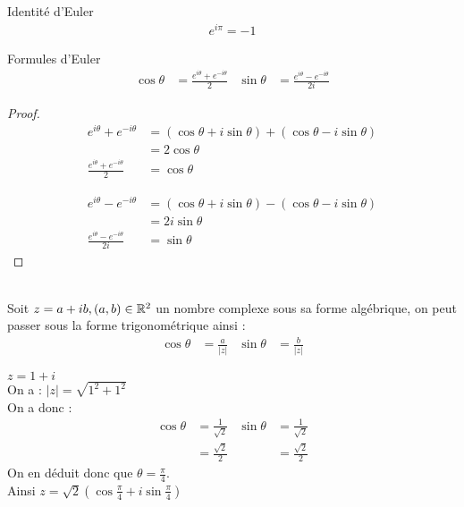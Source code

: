 \begin{proposition}{Identité d'Euler}
    \begin{align*}
        e^{i \pi} = -1
    \end{align*}
\end{proposition}

\begin{proposition}{Formules d'Euler}
    \begin{align*}
        \cos{\theta} &= \frac{e^{i\theta} + e^{-i\theta}}{2} & \sin{\theta} &= \frac{e^{i\theta} - e^{-i\theta}}{2i}
    \end{align*}
\end{proposition}
\begin{proof}
        \begin{align*}
            e^{i\theta} + e^{-i\theta} &= (\cos{\theta} + i\sin{\theta}) + (\cos{\theta} - i\sin{\theta}) \\
                                       &= 2\cos{\theta} \\
        \frac{e^{i\theta} + e^{-i\theta}}{2} &= \cos{\theta}
        \end{align*}
        
        \begin{align*}
            e^{i\theta} - e^{-i\theta} &= (\cos{\theta} + i\sin{\theta}) - (\cos{\theta} - i\sin{\theta}) \\
                                       &= 2i\sin{\theta} \\
            \frac{e^{i\theta} - e^{-i\theta}}{2i} &= \sin{\theta} 
        \end{align*}
\end{proof}

\begin{remarque}~ 
    \\
    Soit $z = a + ib, (a, b) \in \mathbb{R}^2$ un nombre complexe sous sa forme algébrique, on peut passer sous la forme trigonométrique ainsi :
    \begin{align*}
        \cos{\theta} &= \frac{a}{|z|} & \sin{\theta} &= \frac{b}{|z|}
    \end{align*}
    \begin{exemple}
        $z = 1 + i$
        \\
        On a : $|z| = \sqrt{1^2 + 1^2}$
        \\
        On a donc :
        \begin{align*}
            \cos{\theta} &= \frac{1}{\sqrt{2}} & \sin{\theta} &= \frac{1}{\sqrt{2}} \\
                         &= \frac{\sqrt{2}}{2} &              &= \frac{\sqrt{2}}{2}
        \end{align*}
        On en déduit donc que $\theta = \frac{\pi}{4}$. \\
        Ainsi $z = \sqrt{2}\left(\cos{\frac{\pi}{4}} + i\sin{\frac{\pi}{4}}\right)$
    \end{exemple}
\end{remarque}

